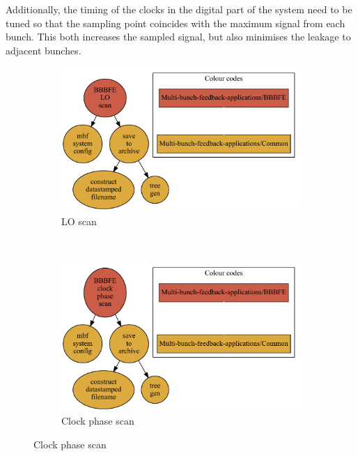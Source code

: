 \documentclass{report}
\begin{document}
Additionally, the timing of the clocks in the digital part of the system need to be tuned so that the sampling point coincides with the maximum signal from each bunch. This both increases the sampled signal, but also minimises the leakage to adjacent bunches.

\begin{figure}[hbt]
   \centering
    \begin{subfigure}[b]{0.3\textwidth}
        \includegraphics[width=\textwidth]{BBBFE_LO_scan.pdf}
        \caption{LO scan}
        \label{fig:LO_scan}
    \end{subfigure}
    ~ %
    \begin{subfigure}[b]{0.3\textwidth}
        \includegraphics[width=\textwidth]{BBBFE_clock_phase_scan.pdf}
        \caption{Clock phase scan}
        \label{fig:clock_phase_scan}
    \end{subfigure}

\end{figure}
\end{document}
